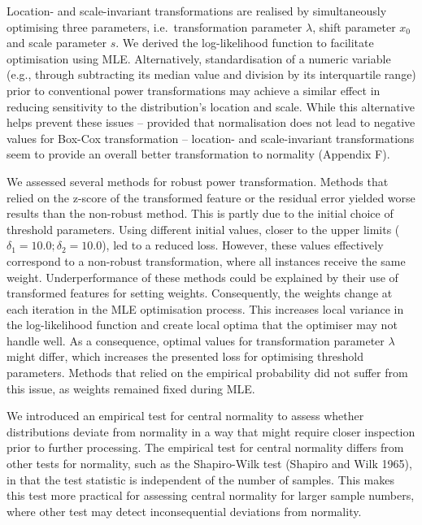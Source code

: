 \documentclass[
  a4paper,
]{article}
\begin{document}
Location- and scale-invariant transformations are realised by
simultaneously optimising three parameters, i.e.~transformation
parameter \(\lambda\), shift parameter \(x_0\) and scale parameter
\(s\). We derived the log-likelihood function to facilitate optimisation
using MLE. Alternatively, standardisation of a numeric variable (e.g.,
through subtracting its median value and division by its interquartile
range) prior to conventional power transformations may achieve a similar
effect in reducing sensitivity to the distribution's location and scale.
While this alternative helps prevent these issues -- provided that
normalisation does not lead to negative values for Box-Cox
transformation -- location- and scale-invariant transformations seem to
provide an overall better transformation to normality (Appendix F).

We assessed several methods for robust power transformation. Methods
that relied on the z-score of the transformed feature or the residual
error yielded worse results than the non-robust method. This is partly
due to the initial choice of threshold parameters. Using different
initial values, closer to the upper limits
(\(\delta_1 = 10.0; \delta_2 = 10.0\)), led to a reduced loss. However,
these values effectively correspond to a non-robust transformation,
where all instances receive the same weight. Underperformance of these
methods could be explained by their use of transformed features for
setting weights. Consequently, the weights change at each iteration in
the MLE optimisation process. This increases local variance in the
log-likelihood function and create local optima that the optimiser may
not handle well. As a consequence, optimal values for transformation
parameter \(\lambda\) might differ, which increases the presented loss
for optimising threshold parameters. Methods that relied on the
empirical probability did not suffer from this issue, as weights
remained fixed during MLE.

We introduced an empirical test for central normality to assess whether
distributions deviate from normality in a way that might require closer
inspection prior to further processing. The empirical test for central
normality differs from other tests for normality, such as the
Shapiro-Wilk test (Shapiro and Wilk 1965), in that the test statistic is
independent of the number of samples. This makes this test more
practical for assessing central normality for larger sample numbers,
where other test may detect inconsequential deviations from normality.
\end{document}
